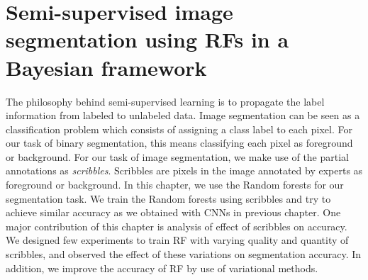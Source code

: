 %
\newpage
\chapter{Semi-supervised image segmentation using RFs in a Bayesian framework}
The philosophy behind semi-supervised learning is to propagate the label information from labeled to unlabeled data. Image segmentation can be seen as a classification problem which consists of assigning a class label to each pixel. For our task of binary segmentation, this means classifying each pixel as foreground or background. For our task of image segmentation, we make use of the partial annotations as \textit{scribbles}. Scribbles are pixels in the image annotated by experts as foreground or background. In this chapter, we use the Random forests for our segmentation task. We train the Random forests using scribbles and try to achieve similar accuracy as we obtained with CNNs in previous chapter. One major contribution of this chapter is analysis of effect of scribbles on accuracy. We designed few experiments to train RF with varying quality and quantity of scribbles, and observed the effect of these variations on segmentation accuracy. In addition, we improve the accuracy of RF by use of variational methods.

